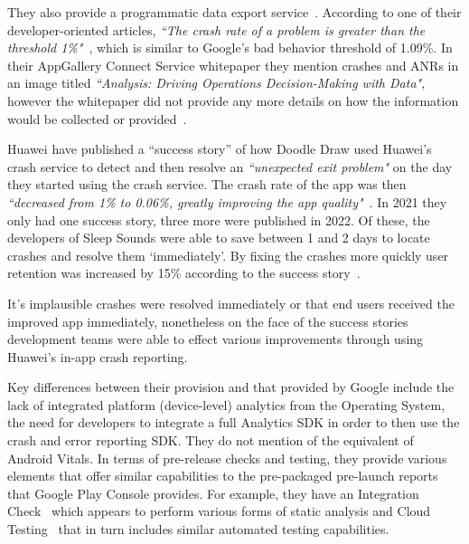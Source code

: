 They also provide a programmatic data export service~. According to one of their developer-oriented articles, \emph{``The crash rate of a problem is greater than the threshold 1\%"}~, which is similar to Google's bad behavior threshold of 1.09\%. In their AppGallery Connect Service whitepaper they mention crashes and ANRs in an image titled \emph{``Analysis: Driving Operations Decision-Making with Data"}, however the whitepaper did not provide any more details on how the information would be collected or provided~. 


Huawei have published a ``success story'' of how Doodle Draw used Huawei's crash service to detect and then resolve an \emph{``unexpected exit problem"} on the day they started using the crash service. The crash rate of the app was then \emph{``decreased from 1\% to 0.06\%, greatly improving the app quality"}~. In 2021 they only had one success story, three more were published in 2022. Of these, the developers of Sleep Sounds were able to save between 1 and 2 days to locate crashes and resolve them `immediately'. By fixing the crashes more quickly user retention was increased by 15\% according to the success story~. 

It's implausible crashes were resolved immediately or that end users received the improved app immediately, nonetheless on the face of the success stories development teams were able to effect various improvements through using Huawei's in-app crash reporting.

Key differences between their provision and that provided by Google include the lack of integrated platform (device-level) analytics from the Operating System, the need for developers to integrate a full Analytics SDK in order to then use the crash and error reporting SDK. They do not mention of the equivalent of Android Vitals. In terms of pre-release checks and testing, they provide various elements that offer similar capabilities to the pre-packaged pre-launch reports that Google Play Console provides. For example, they have an Integration Check~ which appears to perform various forms of static analysis and Cloud Testing~ that in turn includes similar automated testing capabilities. 

